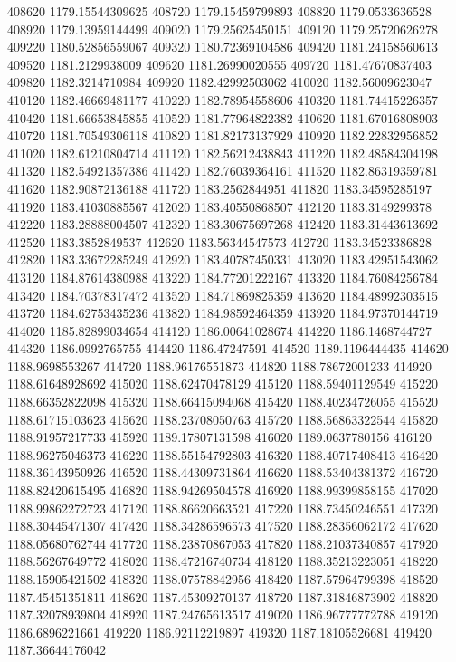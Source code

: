 {408620 1179.15544309625
408720 1179.15459799893
408820 1179.0533636528
408920 1179.13959144499
409020 1179.25625450151
409120 1179.25720626278
409220 1180.52856559067
409320 1180.72369104586
409420 1181.24158560613
409520 1181.2129938009
409620 1181.26990020555
409720 1181.47670837403
409820 1182.3214710984
409920 1182.42992503062
410020 1182.56009623047
410120 1182.46669481177
410220 1182.78954558606
410320 1181.74415226357
410420 1181.66653845855
410520 1181.77964822382
410620 1181.67016808903
410720 1181.70549306118
410820 1181.82173137929
410920 1182.22832956852
411020 1182.61210804714
411120 1182.56212438843
411220 1182.48584304198
411320 1182.54921357386
411420 1182.76039364161
411520 1182.86319359781
411620 1182.90872136188
411720 1183.2562844951
411820 1183.34595285197
411920 1183.41030885567
412020 1183.40550868507
412120 1183.3149299378
412220 1183.28888004507
412320 1183.30675697268
412420 1183.31443613692
412520 1183.3852849537
412620 1183.56344547573
412720 1183.34523386828
412820 1183.33672285249
412920 1183.40787450331
413020 1183.42951543062
413120 1184.87614380988
413220 1184.77201222167
413320 1184.76084256784
413420 1184.70378317472
413520 1184.71869825359
413620 1184.48992303515
413720 1184.62753435236
413820 1184.98592464359
413920 1184.97370144719
414020 1185.82899034654
414120 1186.00641028674
414220 1186.1468744727
414320 1186.0992765755
414420 1186.47247591
414520 1189.1196444435
414620 1188.9698553267
414720 1188.96176551873
414820 1188.78672001233
414920 1188.61648928692
415020 1188.62470478129
415120 1188.59401129549
415220 1188.66352822098
415320 1188.66415094068
415420 1188.40234726055
415520 1188.61715103623
415620 1188.23708050763
415720 1188.56863322544
415820 1188.91957217733
415920 1189.17807131598
416020 1189.0637780156
416120 1188.96275046373
416220 1188.55154792803
416320 1188.40717408413
416420 1188.36143950926
416520 1188.44309731864
416620 1188.53404381372
416720 1188.82420615495
416820 1188.94269504578
416920 1188.99399858155
417020 1188.99862272723
417120 1188.86620663521
417220 1188.73450246551
417320 1188.30445471307
417420 1188.34286596573
417520 1188.28356062172
417620 1188.05680762744
417720 1188.23870867053
417820 1188.21037340857
417920 1188.56267649772
418020 1188.47216740734
418120 1188.35213223051
418220 1188.15905421502
418320 1188.07578842956
418420 1187.57964799398
418520 1187.45451351811
418620 1187.45309270137
418720 1187.31846873902
418820 1187.32078939804
418920 1187.24765613517
419020 1186.96777772788
419120 1186.6896221661
419220 1186.92112219897
419320 1187.18105526681
419420 1187.36644176042
}
